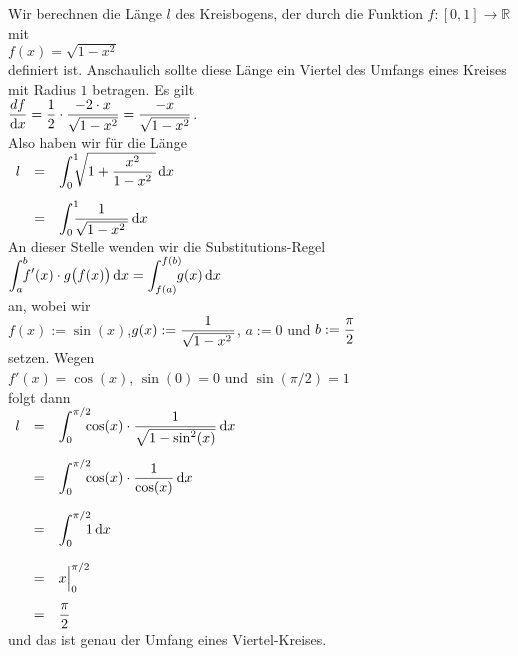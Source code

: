 \example
Wir berechnen die L\"ange $l$ des Kreisbogens, der durch die Funktion $f:[0,1] \rightarrow\mathbb{R}$ mit
\\[0.2cm]
\hspace*{1.3cm}
$f(x) = \sqrt{1 - x^2}$
\\[0.2cm]
definiert ist.  Anschaulich sollte diese L\"ange ein Viertel des Umfangs eines Kreises mit Radius $1$ betragen.
Es gilt
\\[0.2cm]
\hspace*{1.3cm}
$\displaystyle\frac{d\/f}{\textrm{d} x} = \frac{1}{2} \cdot \frac{-2 \cdot x}{\sqrt{1 - x^2}} = 
                  \frac{- x}{\sqrt{1 - x^2}}
$.
\\[0.2cm]
Also haben wir f\"ur die L\"ange
\\[0.2cm]
\hspace*{1.3cm}
$
\begin{array}[t]{lcl}
l & = & \dint{0}{1} \sqrt{1 + \frac{x^2}{1 - x^2}\,}\, \dr x \\[0.5cm]
  & = & \dint{0}{1} \frac{1}{\sqrt{1 - x^2\,}}\, \dr x
\end{array}
$
\\[0.2cm]
An dieser Stelle wenden wir die Substitutions-Regel
\\[0.2cm]
\hspace*{1.3cm}
$\dint{a}{b} f'(x) \cdot  g\bigl(f(x)\bigr)\, \dr x = \dint{f(a)}{f(b)} g(x)\, \dr x$
\\[0.2cm]
an, wobei wir 
\\[0.2cm]
\hspace*{1.3cm}
$f(x) := \sin(x)$,\quad $g(x) := \displaystyle \frac{1}{\sqrt{1 - x^2\,}}$, 
\quad $a := 0$ \quad und \quad $b := \displaystyle \frac{\pi}{2}$
\\[0.2cm]
setzen. Wegen
\\[0.2cm]
\hspace*{1.3cm}
$f'(x) = \cos(x)$, \quad $\sin(0) = 0$ \quad und \quad $\sin(\pi/2) = 1$
\\[0.2cm]
folgt dann
\\[0.2cm]
\hspace*{1.3cm}
$
\begin{array}[t]{lcl}
l & = & \dint{0}{\pi/2} \cos(x) \cdot \frac{1}{\sqrt{1 - \sin^2(x)}}\, \dr x  \\[0.6cm]
  & = & \dint{0}{\pi/2} \cos(x) \cdot \frac{1}{\cos(x)}\, \dr x  \\[0.6cm]
  & = & \dint{0}{\pi/2} 1\, \dr x  \\[0.6cm]
  & = &  x \Bigl|_0^{\pi/2}  \\[0.4cm]
  & = & \ds \frac{\pi}{2}  
\end{array}
$
\\[0.2cm]
und das ist genau der Umfang eines Viertel-Kreises. \eod

